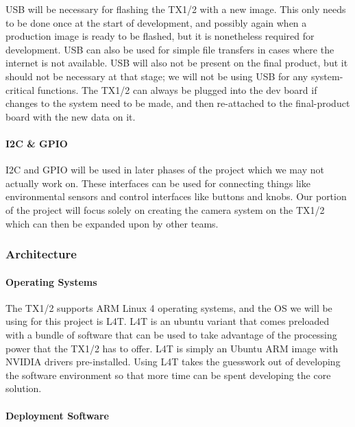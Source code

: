 USB will be necessary for flashing the TX1/2 with a new image. This only needs to be 
done once at the start of development, and possibly again when a production image is 
ready to be flashed, but it is nonetheless required for development. USB can also be 
used for simple file transfers in cases where the internet is not available. USB will 
also not be present on the final product, but it should not be necessary at that stage; 
we will not be using USB for any system-critical functions. The TX1/2 can always be 
plugged into the dev board if changes to the system need to be made, and then 
re-attached to the final-product board with the new data on it.\\

\paragraph{I2C \& GPIO}

I2C and GPIO will be used in later phases of the project which we may not actually 
work on. These interfaces can be used for connecting things like environmental sensors 
and control interfaces like buttons and knobs. Our portion of the project will focus 
solely on creating the camera system on the TX1/2 which can then be expanded upon by 
other teams. \\

\subsubsection{Architecture}

\paragraph{Operating Systems}

The TX1/2 supports ARM Linux 4 operating systems, and the OS we will be using for this 
project is L4T. L4T is an ubuntu variant that comes preloaded with a 
bundle of software that can be used to take advantage of the processing power that 
the TX1/2 has to offer. L4T is simply an Ubuntu ARM image with NVIDIA drivers 
pre-installed. Using L4T takes the guesswork out of developing the software 
environment so that more time can be spent developing the core solution. \\

\paragraph{Deployment Software}

